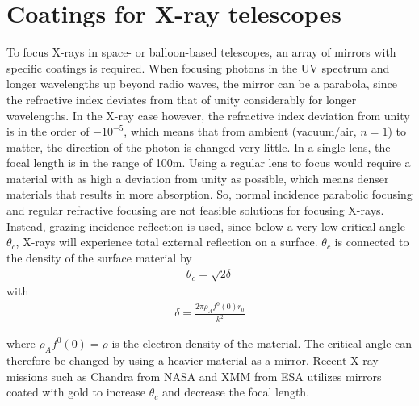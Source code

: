 \section{Coatings for X-ray telescopes}
To focus X-rays in space- or balloon-based telescopes, an array of mirrors with specific coatings is required. When focusing photons in the UV spectrum and longer wavelengths up beyond radio waves, the mirror can be a parabola, since the refractive index deviates from that of unity considerably for longer wavelengths. In the X-ray case however, the refractive index deviation from unity is in the order of $-10^{-5}$, which means that from ambient (vacuum/air, $n=1$) to matter, the direction of the photon is changed very little. In a single lens, the focal length is in the range of 100m. Using a regular lens to focus would require a material with as high a deviation from unity as possible, which means denser materials that results in more absorption. So, normal incidence parabolic focusing and regular refractive focusing are not feasible solutions for focusing X-rays. Instead, grazing incidence reflection is used, since below a very low critical angle $\theta_c$, X-rays will experience total external reflection on a surface\cite{AlsNielsen:2001vt}. $\theta_c$ is connected to the density of the surface material by
\begin{eqnarray}
	\theta_c = \sqrt{2\delta}
\end{eqnarray}
with
\begin{eqnarray}
	\delta = \frac{2\pi \rho_A f^0 (0) r_0}{k^2}
\end{eqnarray}

where $\rho_A f^0 (0)=\rho$ is the electron density of the material. The critical angle can therefore be changed by using a heavier material as a mirror. Recent X-ray missions such as Chandra from NASA and XMM from ESA utilizes mirrors coated with gold to increase $\theta_c$ and decrease the focal length.

